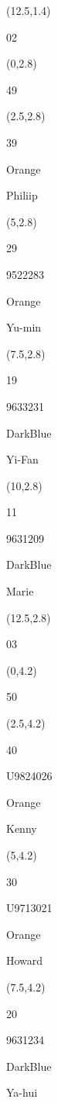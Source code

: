 \documentclass[a4paper]{article}
\newcommand{\myseat}[4]{%
\vspace{-0.1cm}
\parbox[t][2.2cm][t]{3.5cm}{
\small #1 %
\begin{description}
\vspace{-0.1cm}
\item [ID:] #2
\vspace{-0.1cm}
\item [Team:] #3 \normalsize
\vspace{-0.1cm}
\item \normalsize #4
\vspace{-0.1cm}
\end{description}
}
}
\begin{document}
\begin{CJK}{UTF8}{cyberbit}
\begin{textblock}{2.5}(12.5,1.4)
\textblockcolor{}
	\myseat{02}{}{}{}
\end{textblock}

\begin{textblock}{2.5}(0,2.8)
\textblockcolor{}
	\myseat{49}{}{}{}
\end{textblock}

\begin{textblock}{2.5}(2.5,2.8)
	\myseat{39}{}{Orange}{Philiip}
\end{textblock}

\begin{textblock}{2.5}(5,2.8)
	\myseat{29}{9522283}{Orange}{Yu-min}
\end{textblock}

\begin{textblock}{2.5}(7.5,2.8)
	\myseat{19}{9633231}{DarkBlue}{Yi-Fan}
\end{textblock}

\begin{textblock}{2.5}(10,2.8)
	\myseat{11}{9631209}{DarkBlue}{Marie}
\end{textblock}

\begin{textblock}{2.5}(12.5,2.8)
\textblockcolor{}
	\myseat{03}{}{}{}
\end{textblock}

\begin{textblock}{2.5}(0,4.2)
\textblockcolor{}
	\myseat{50}{}{}{}
\end{textblock}

\begin{textblock}{2.5}(2.5,4.2)
	\myseat{40}{U9824026}{Orange}{Kenny}
\end{textblock}

\begin{textblock}{2.5}(5,4.2)
	\myseat{30}{U9713021}{Orange}{Howard}
\end{textblock}

\begin{textblock}{2.5}(7.5,4.2)
	\myseat{20}{9631234}{DarkBlue}{Ya-hui}
\end{textblock}


\end{CJK}
\end{document}
